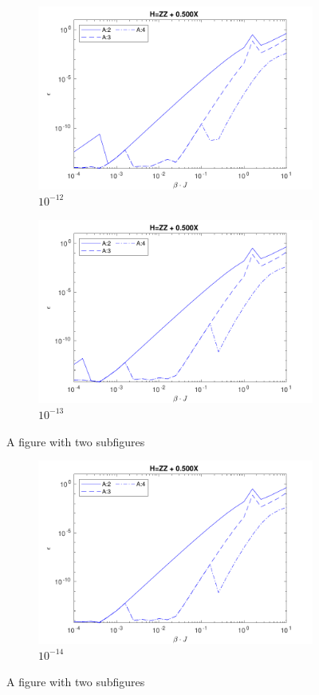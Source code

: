 \begin{figure} \ContinuedFloat
	\centering
	\begin{subfigure}{\textwidth}
		\centering
		\includegraphics[width=0.8\linewidth]{Figuren/mpo_construction/sigm0/e12.pdf}
		\caption{ ${10}^{-12}$}
		\label{fig:sub1}
	\end{subfigure}%

	\begin{subfigure}{\textwidth}
		\centering
		\includegraphics[width=0.8\linewidth]{Figuren/mpo_construction/sigm0/e13.pdf}
		\caption{${10}^{-13}$}
		\label{fig:sub2}
	\end{subfigure}
	\caption{A figure with two subfigures}
	\label{fig:sigman0}
\end{figure}

\begin{figure} \ContinuedFloat
	\centering
	\begin{subfigure}{\textwidth}
		\centering
		\includegraphics[width=0.8\linewidth]{Figuren/mpo_construction/sigm0/e14.pdf}
		\caption{ ${10}^{-14}$}
		\label{fig:sub1}
	\end{subfigure}%
	\caption{A figure with two subfigures}
	\label{fig:sigman0}
\end{figure}


